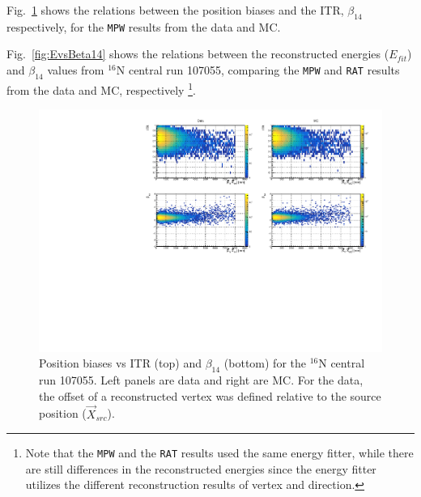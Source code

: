 Fig.~\ref{n16_highLevelCut} shows the relations between the position biases and the ITR, $\beta_{14}$ respectively, for the \texttt{MPW} results from the data and MC.

Fig.~\ref{fig:EvsBeta14} shows the relations between the reconstructed energies ($E_{fit}$) and $\beta_{14}$ values from $^{16}$N central run 107055, comparing the \texttt{MPW} and \texttt{RAT} results from the data and MC, respectively \footnote{Note that the \texttt{MPW} and the \texttt{RAT} results used the same energy fitter, while there are still differences in the reconstructed energies since the energy fitter utilizes the different reconstruction results of vertex and direction.}. 

\begin{figure}
	\centering
	\includegraphics[width=14cm]{N16_107055_highLevelCuts.pdf}
	\caption[Position biases vs ITR and $\beta_{14}$ for the $^{16}$N central run 107055.]{Position biases vs ITR (top) and $\beta_{14}$ (bottom) for the $^{16}$N central run 107055. Left panels are data and right are MC. For the data, the offset of a reconstructed vertex was defined relative to the source position ($\vec{X}_{src}$). \label{n16_highLevelCut}}
\end{figure}

